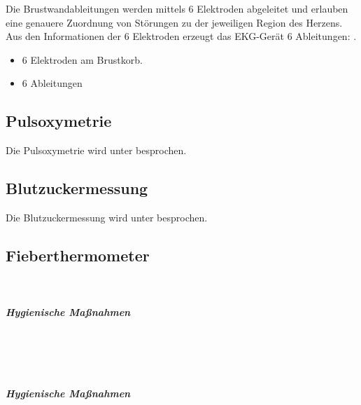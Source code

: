 {
Die Brustwandableitungen werden mittels 6 Elektroden abgeleitet und
erlauben eine genauere Zuordnung von Störungen zu der jeweiligen
Region des Herzens. Aus den Informationen der 6 Elektroden erzeugt das
EKG-Gerät 6 Ableitungen: . 
}{
\begin{itemize}
    \item 6 Elektroden am Brustkorb.
    \item 6 Ableitungen
\end{itemize}
}





\begin{table}[H]
\end{table}

\subsection{Pulsoxymetrie}

Die Pulsoxymetrie wird unter
 besprochen.

\subsection{Blutzuckermessung}

Die Blutzuckermessung wird unter
 besprochen.

\subsection{Fieberthermometer}


{~

\gTakeNotesLarge

\subparagraph{Hygienische Maßnahmen}~

\gTakeNotesMedium
}{}{}{}{}

{~

\gTakeNotesLarge

\subparagraph{Hygienische Maßnahmen}~

\gTakeNotesMedium
}{}{}{}{}


\nocite{RueckerBildatlas1}
